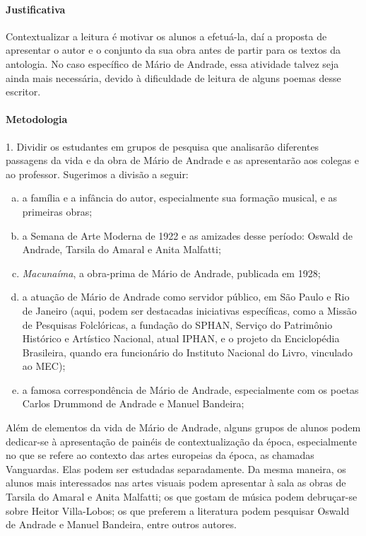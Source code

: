 \documentclass[11pt]{extarticle}
\begin{document}
\paragraph{Justificativa} Contextualizar a leitura é motivar os alunos a
efetuá-la, daí a proposta de apresentar o autor e o conjunto da sua obra
antes de partir para os textos da antologia. No caso específico de Mário
de Andrade, essa atividade talvez seja ainda mais necessária, devido à
dificuldade de leitura de alguns poemas desse escritor.

\paragraph{Metodologia}


1. Dividir os estudantes em grupos de pesquisa que analisarão diferentes
passagens da vida e da obra de Mário de Andrade e as apresentarão aos
colegas e ao professor. Sugerimos a divisão a seguir:

\begin{enumerate}[(a)]
\item a família e a infância do autor, especialmente sua formação musical,
e as primeiras obras;

\item a Semana de Arte Moderna de 1922 e as amizades desse período: Oswald
de Andrade, Tarsila do Amaral e Anita Malfatti;

\item \emph{Macunaíma}, a obra-prima de Mário de Andrade, publicada em
1928;

\item a atuação de Mário de Andrade como servidor público, em São Paulo e
Rio de Janeiro (aqui, podem ser destacadas iniciativas específicas, como
a Missão de Pesquisas Folclóricas, a fundação do SPHAN, Serviço do
Patrimônio Histórico e Artístico Nacional, atual IPHAN, e o projeto da
Enciclopédia Brasileira, quando era funcionário do Instituto Nacional do
Livro, vinculado ao MEC);

\item a famosa correspondência de Mário de Andrade, especialmente com os
poetas Carlos Drummond de Andrade e Manuel Bandeira;
\end{enumerate}

Além de elementos da vida de Mário de Andrade, alguns grupos de alunos
podem dedicar-se à apresentação de painéis de contextualização da época,
especialmente no que se refere ao contexto das artes europeias da época,
as chamadas Vanguardas. Elas podem ser estudadas separadamente. Da mesma
maneira, os alunos mais interessados nas artes visuais podem apresentar
à sala as obras de Tarsila do Amaral e Anita Malfatti; os que gostam de
música podem debruçar-se sobre Heitor Villa-Lobos; os que preferem a
literatura podem pesquisar Oswald de Andrade e Manuel Bandeira, entre
outros autores.
\end{document}
